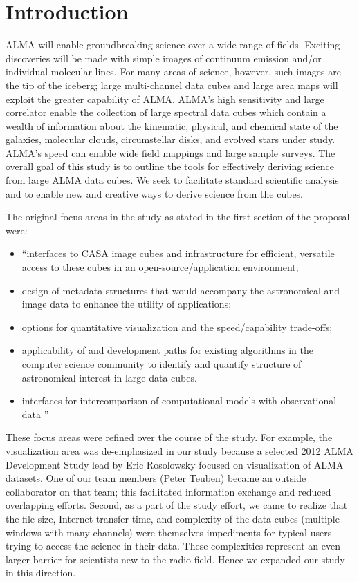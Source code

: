 \section{Introduction}

ALMA will enable groundbreaking science over a wide range of fields. 
Exciting discoveries will be made with simple images of continuum 
emission and/or individual molecular lines. For many areas of science, 
however, such images are the tip of the iceberg; large multi-channel
data cubes and large area maps will exploit the greater capability
of ALMA.  ALMA's high sensitivity and large correlator enable
the collection of large spectral data cubes which contain a wealth of
information about the kinematic, physical, and chemical state of the 
galaxies, molecular clouds, circumstellar disks, and evolved stars under study. 
ALMA's speed can enable wide field mappings and large sample surveys.
The overall goal of this study is to outline
the tools for effectively deriving science from
large ALMA data cubes. We seek to facilitate standard 
scientific analysis and to enable new and creative ways to derive 
science from the cubes.  

The original focus areas in the study as stated in the first
section of the proposal were:
\begin{itemize}
\item ``interfaces to CASA image cubes and infrastructure for efficient, versatile access to 
these cubes in an open-source/application environment;
\item design of metadata structures that would accompany the astronomical and image data 
to enhance the utility of applications;
\item options for quantitative visualization and the speed/capability trade-offs;
\item applicability of and development paths for existing algorithms in the computer 
science community to identify and quantify structure of astronomical interest in large data cubes.
\item interfaces for intercomparison of computational models with observational data ''
\end{itemize}

These focus areas were refined over the course of the study. 
For example, the visualization area was de-emphasized in our study because 
a selected 2012 ALMA Development Study lead by Eric Rosolowsky focused
on visualization of ALMA datasets. One of our team members (Peter Teuben)
became an outside collaborator on that team; this facilitated information
exchange and reduced overlapping efforts. Second,
as a part of the study effort, we came to realize that the file size, 
Internet transfer time, and complexity of the data cubes (multiple windows
with many channels) were themselves impediments for typical users trying to 
access the science in their data. These complexities represent an even
larger barrier for scientists new to the radio field. Hence we expanded
our study in this direction.

